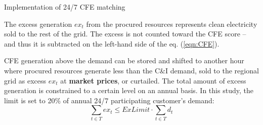 \begin{frame}{Implementation of 24/7 CFE matching}

  {\small

  The excess generation $ex_t$ from the procured resources represents clean electricity sold to the rest of the grid. 
  The \alert{excess is not counted toward the CFE score} -- 
  and thus it is subtracted on the left-hand side of the eq. (\ref{eqn:CFE}).

  CFE generation above the demand can be stored and shifted to another hour where procured resources 
  generate less than the C\&I demand, sold to the regional grid as excess $ex_t$
  at {\bf market prices}, or curtailed. 
  The total amount of excess generation is constrained to a certain level on an annual basis. 
  In this study, the limit is set to 20\% of annual 24/7 participating customer's demand:
  \vspace{0.1cm}
  \begin{equation}
  \sum_{t\in T} ex_t \leq ExLimit \cdot \sum_{t\in T} d_t
  \label{eqn:excess}
  \end{equation}

  \noindent{}

  \noindent{}
  }

\end{frame}




